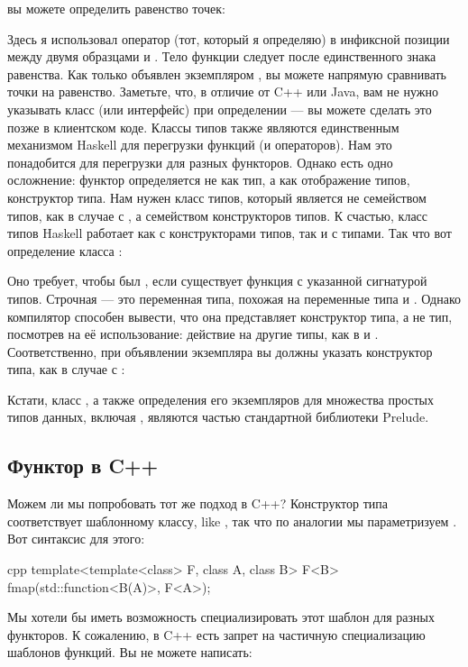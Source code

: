 вы можете определить равенство точек:

Здесь я использовал оператор \code{(==)} (тот, который я определяю) в инфиксной позиции между двумя образцами  и . Тело функции следует после единственного знака равенства. Как только  объявлен экземпляром , вы можете напрямую сравнивать точки на равенство. Заметьте, что, в отличие от C++ или Java, вам не нужно указывать класс  (или интерфейс) при определении  — вы можете сделать это позже в клиентском коде. Классы типов также являются единственным механизмом Haskell для перегрузки функций (и операторов). Нам это понадобится для перегрузки  для разных функторов. Однако есть одно осложнение: функтор определяется не как тип, а как отображение типов, конструктор типа. Нам нужен класс типов, который является не семейством типов, как в случае с , а семейством конструкторов типов. К счастью, класс типов Haskell работает как с конструкторами типов, так и с типами. Так что вот определение класса :

Оно требует, чтобы  был , если существует функция  с указанной сигнатурой типов. Строчная  — это переменная типа, похожая на переменные типа  и . Однако компилятор способен вывести, что она представляет конструктор типа, а не тип, посмотрев на её использование: действие на другие типы, как в  и . Соответственно, при объявлении экземпляра  вы должны указать конструктор типа, как в случае с :

Кстати, класс , а также определения его экземпляров для множества простых типов данных, включая , являются частью стандартной библиотеки Prelude.

\subsection{Функтор в C++}

Можем ли мы попробовать тот же подход в C++? Конструктор типа соответствует шаблонному классу, like , так что по аналогии мы параметризуем   . Вот синтаксис для этого:

\begin{snip}{cpp}
template<template<class> F, class A, class B>
F<B> fmap(std::function<B(A)>, F<A>);
\end{snip}
Мы хотели бы иметь возможность специализировать этот шаблон для разных функторов. К сожалению, в C++ есть запрет на частичную специализацию шаблонов функций. Вы не можете написать:

